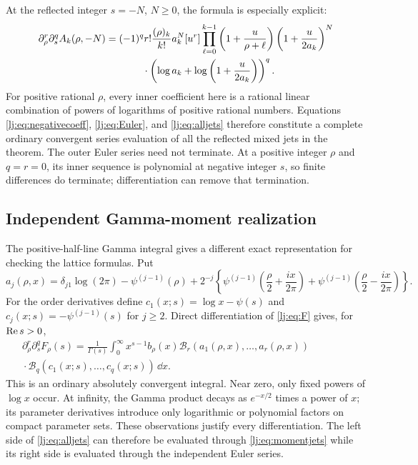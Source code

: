 At the reflected integer $s=-N$, $N\geq0$, the formula is especially
explicit:
\begin{equation}
\begin{split}
 \partial_\rho^r\partial_s^q A_k(\rho,-N)
 &=(-1)^q r!\frac{(\rho)_k}{k!}a_k^N[u^r]
       \prod_{\ell=0}^{k-1}\left(1+\frac{u}{\rho+\ell}\right)
       \left(1+\frac{u}{2a_k}\right)^N\\
 &\hspace{13mm}\cdot
       \left(\log a_k+\log\left(1+\frac{u}{2a_k}\right)\right)^q.
\end{split}
 \label{lj:eq:negativecoeff}
\end{equation}
For positive rational $\rho$, every inner coefficient here is a rational
linear combination of powers of logarithms of positive rational numbers.
Equations \eqref{lj:eq:negativecoeff}, \eqref{lj:eq:Euler}, and
\eqref{lj:eq:alljets} therefore constitute a complete ordinary convergent
series evaluation of all the reflected mixed jets in the theorem.
The outer Euler series need not terminate. At a positive integer $\rho$
and $q=r=0$, its inner sequence is polynomial at negative integer $s$,
so finite differences do terminate; differentiation can remove that
termination.

\subsection{Independent Gamma-moment realization}

The positive-half-line Gamma integral gives a different exact
representation for checking the lattice formulas. Put
\begin{equation}
 a_j(\rho,x)=\delta_{j1}\log(2\pi)-\psi^{(j-1)}(\rho)
  +2^{-j}\left\{
   \psi^{(j-1)}\left(\frac\rho2+\frac{ix}{2\pi}\right)
  +\psi^{(j-1)}\left(\frac\rho2-\frac{ix}{2\pi}\right)\right\}.
 \label{lj:eq:Gammajet}
\end{equation}
For the order derivatives define $c_1(x;s)=\log x-\psi(s)$ and
$c_j(x;s)=-\psi^{(j-1)}(s)$ for $j\geq2$. Direct differentiation of
\eqref{lj:eq:F} gives, for $\operatorname{Re} s>0$,
\begin{equation}
\begin{split}
 \partial_\rho^r\partial_s^qF_\rho(s)
  =\frac1{\Gamma(s)}\int_0^\infty
      x^{s-1}b_\rho(x)
      \mathcal B_r(a_1(\rho,x),\ldots,a_r(\rho,x))\qquad\qquad\\[-2pt]
      {}\cdot\mathcal B_q(c_1(x;s),\ldots,c_q(x;s))\,\dd x.
\end{split}
 \label{lj:eq:momentjets}
\end{equation}
This is an ordinary absolutely convergent integral. Near zero, only
fixed powers of $\log x$ occur. At infinity, the Gamma product decays
as $e^{-x/2}$ times a power of $x$; its parameter derivatives introduce
only logarithmic or polynomial factors on compact parameter sets.
These observations justify every differentiation. The left side of
\eqref{lj:eq:alljets} can therefore be evaluated through
\eqref{lj:eq:momentjets} while its right side is evaluated through
the independent Euler series.

